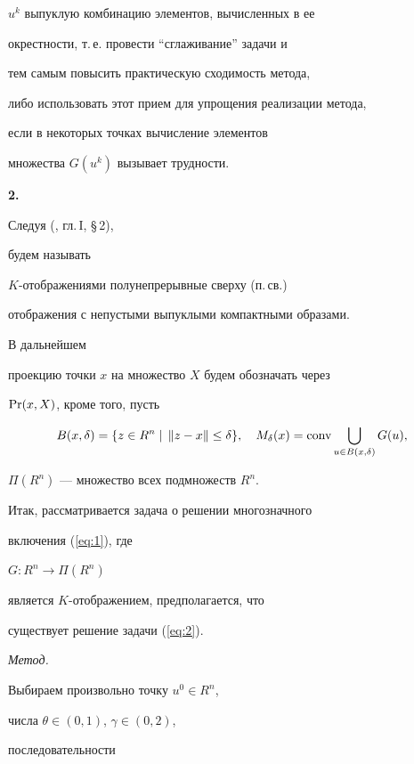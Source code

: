 $u^{k}$ выпуклую комбинацию элементов, вычисленных в ее


окрестности, т.\,е.{} провести ``сглаживание'' задачи и


тем самым повысить практическую сходимость метода,


либо использовать этот прием для упрощения реализации метода,


если в некоторых точках вычисление элементов


множества $G(u^{k})$ вызывает трудности.








{\bf 2.}


Следуя (\cite{BVI74}, гл.\,I, \S\,2),


будем называть


$K$-отображениями полунепрерывные сверху (п.\,св.)


отображения с непустыми выпуклыми компактными образами.


В дальнейшем


проекцию точки $x$ на множество $X$ будем обозначать через


$\operatorname{Pr}(x,X)$, кроме того, пусть


$$


B(x,\delta)= \{z\in R^{n}\mid\, \| z-x \| \leq \delta \},\quad


M_{\delta }(x) = \conv \bigcup_{u\in B (x, \delta ) } G(u),


$$


$\Pi (R^{n})$ --- множество всех подмножеств $R^{n}$.





Итак, рассматривается задача о решении многозначного


включения (\ref{eq:1}), где


$G:R^{n} \longrightarrow \Pi (R^{n})$


является $K$-отображением, предполагается, что


существует решение задачи (\ref{eq:2}).








{\it Метод.}


Выбираем произвольно точку $u^{0}\in R^{n}$,


числа $\theta \in (0,1)$, $\gamma \in (0,2)$,


последовательности



